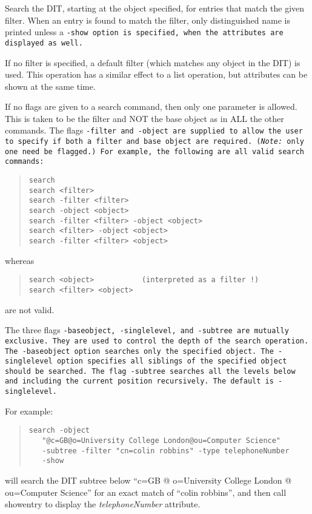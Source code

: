 Search the DIT, starting at the object specified, for entries that match
the given filter.
When an entry is found to match the filter, only distinguished name is printed
unless a \tt-show\rm \ option is 
specified, when the attributes are displayed as well.

If no filter is specified, a default filter (which matches any object in
the DIT) is used.
This operation has a similar effect to a 
list operation, but attributes can be shown at the same time.

If no flags are given to a search command, then only one 
parameter is allowed. This is taken to be the
filter and NOT the base object as in ALL the other commands.
The flags \tt -filter\rm \ and \tt -object\rm \ are supplied to allow the
user to specify if both a filter and base object are required.
({\em Note:} only one need be flagged.)
For example, the following are all valid search commands:
\begin{quote}\begin{verbatim}
search
search <filter>
search -filter <filter>
search -object <object>
search -filter <filter> -object <object>
search <filter> -object <object>
search -filter <filter> <object>
\end{verbatim}\end{quote}
whereas 
\begin{quote}\begin{verbatim}
search <object>           (interpreted as a filter !)
search <filter> <object>
\end{verbatim}\end{quote}
are not valid.

The three flags 
\tt -baseobject\rm,  
\tt -singlelevel\rm,  and
\tt -subtree\rm \ 
are mutually exclusive.  They are used to control the depth of the 
search operation.
The \tt -baseobject\rm\ option searches only the specified object.
The \tt -singlelevel\rm \ option specifies all siblings of the 
specified object should be  searched.
The flag \tt -subtree\rm \ searches all the 
levels below and including the current position recursively.
The default is
\tt -singlelevel\rm.

For example:
\begin{quote}\small\begin{verbatim}
search -object 
   "@c=GB@o=University College London@ou=Computer Science"
   -subtree -filter "cn=colin robbins" -type telephoneNumber
   -show
\end{verbatim}\end{quote}
will search the DIT subtree below 
``c=GB @ o=University College London @ 
ou=Computer Science'' for
an exact match of ``colin robbins'', and then call showentry to 
display the {\em telephoneNumber} attribute.

